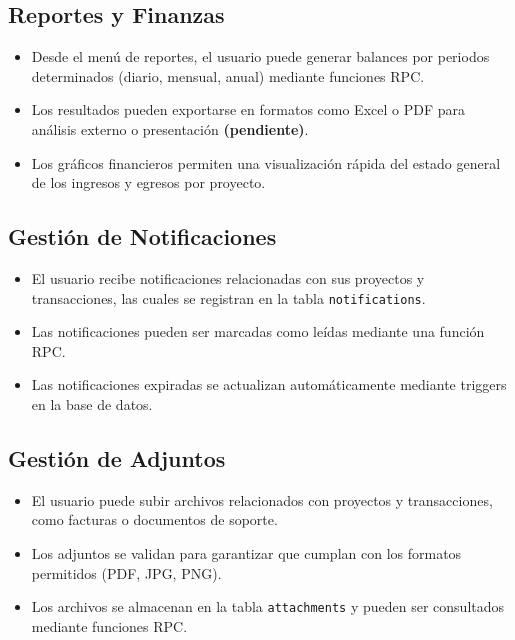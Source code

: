 \subsection{Reportes y Finanzas}
\begin{itemize}
    \item Desde el menú de reportes, el usuario puede generar balances por periodos determinados (diario, mensual, anual) mediante funciones RPC.
    \item Los resultados pueden exportarse en formatos como Excel o PDF para análisis externo o presentación \textbf{(pendiente)}.
    \item Los gráficos financieros permiten una visualización rápida del estado general de los ingresos y egresos por proyecto.
\end{itemize}

\subsection{Gestión de Notificaciones}
\begin{itemize}
    \item El usuario recibe notificaciones relacionadas con sus proyectos y transacciones, las cuales se registran en la tabla \texttt{notifications}.
    \item Las notificaciones pueden ser marcadas como leídas mediante una función RPC.
    \item Las notificaciones expiradas se actualizan automáticamente mediante triggers en la base de datos.
\end{itemize}

\subsection{Gestión de Adjuntos}
\begin{itemize}
    \item El usuario puede subir archivos relacionados con proyectos y transacciones, como facturas o documentos de soporte.
    \item Los adjuntos se validan para garantizar que cumplan con los formatos permitidos (PDF, JPG, PNG).
    \item Los archivos se almacenan en la tabla \texttt{attachments} y pueden ser consultados mediante funciones RPC.
\end{itemize}